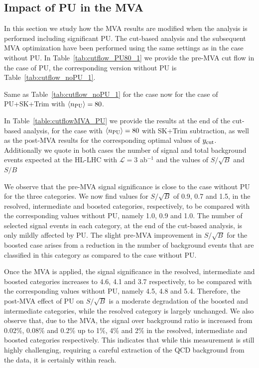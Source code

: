 \subsection{Impact of PU in the MVA}

In this section we study how the MVA results are modified
when the analysis is performed including significant PU.
%
The cut-based analysis and the subsequent
MVA optimization have been performed using the same
settings as in the case without PU.
%
In Table~\ref{tab:cutflow_PU80_1}
we provide the pre-MVA cut flow in the case of PU,
the corresponding version without PU is
Table~\ref{tab:cutflow_noPU_1}.

\begin{table}[t]
  \centering
  \scriptsize
      
    \caption{\small Same as Table~\ref{tab:cutflow_noPU_1}
for the case  now for the case
    of PU+SK+Trim with $\left\langle n_{\rm PU}\right\rangle=80$.
 \label{tab:cutflow_PU80_1}}
\end{table}

In Table~\ref{table:cutflowMVA_PU} we provide the results
  at the end of the cut-based analysis,
  for the case with $\left\langle n_{\rm PU}\right\rangle=80$ with SK+Trim
  subtraction,
  as well as the post-MVA results for the
  corresponding optimal values of $y_{\rm cut}$.
  Additionally we quote in
  both cases the number of signal and
    total background events expected
    at the HL-LHC with $\mathcal{L}=3$ ab$^{-1}$
    and the values of $S/\sqrt{B}$ and $S/B$

  
We observe that the pre-MVA 
signal significance is close
to the case without PU for the three categories.
%
We now find values for $S/\sqrt{B}$ of 0.9, 0.7 and 1.5, in the resolved,
intermediate and boosted categories, respectively, to be compared
with the corresponding values without PU, namely 1.0, 0.9 and 1.0.
%
The number of selected
signal events in each category, at the
end of the cut-based analysis, is only mildly affected
by PU.
%
The slight pre-MVA improvement in $S/\sqrt{B}$ for the
boosted case arises from a reduction in the number
of background events that are classified in this category
as compared to the case without PU.


Once the MVA is applied, the signal significance in the 
resolved, intermediate and boosted
categories increases to 4.6, 4.1 and 3.7 respectively,
to be compared with the corresponding values
without PU, namely 4.5, 4.8 and 5.4.
%
Therefore, the post-MVA effect of PU on $S/\sqrt{B}$ is
a moderate degradation of the boosted and intermediate categories,
while the resolved category is largely unchanged.
%
We also observe that, due
to the MVA, the
signal over background ratio is increased from 0.02\%, 0.08\% and
0.2\% up to 1\%, 4\% and 2\% in the resolved, intermediate
and boosted categories respectively.
%
This indicates that while this measurement is still highly challenging,
requiring a careful extraction of the QCD
background from the data, it is certainly within reach.

